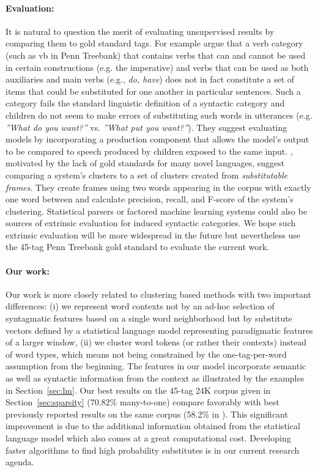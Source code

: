 \documentclass[11pt]{article}
\newcommand{\collapseResult}{70.82}
\begin{document}
\paragraph{Evaluation:}
It is natural to question the merit of evaluating unsupervised results
by comparing them to gold standard tags.  For example
\cite{freudenthal2005resolution} argue that a verb category (such as
{\sc vb} in Penn Treebank) that contains verbs that can and cannot be
used in certain constructions (e.g. the imperative) and verbs that can
be used as both auxiliaries and main verbs (e.g., {\em do, have}) does
not in fact constitute a set of items that could be substituted for
one another in particular sentences.  Such a category fails the
standard linguistic definition of a syntactic category and children do
not seem to make errors of substituting such words in utterances
(e.g. {\em''What do you want?''} vs. {\em *''What put you want?''}).
They suggest evaluating models by incorporating a production component
that allows the model's output to be compared to speech produced by
children exposed to the same input.  \cite{frank2009evaluating},
motivated by the lack of gold standards for many novel languages,
suggest comparing a system's clusters to a set of clusters created
from {\em substitutable frames}.  They create frames using two words
appearing in the corpus with exactly one word between and calculate
precision, recall, and F-score of the system's clustering.
Statistical parsers or factored machine learning systems could also be
sources of extrinsic evaluation for induced syntactic categories.  We
hope such extrinsic evaluation will be more widespread in the future
but nevertheless use the 45-tag Penn Treebank gold standard to
evaluate the current work.

\paragraph{Our work:}
Our work is more closely related to clustering based methods with two
important differences: (i) we represent word contexts not by an ad-hoc
selection of syntagmatic features based on a single word neighborhood
but by substitute vectors defined by a statistical language model
representing paradigmatic features of a larger window, (ii) we cluster
word tokens (or rather their contexts) instead of word types, which
means not being constrained by the one-tag-per-word assumption from
the beginning.  The features in our model incorporate semantic as well
as syntactic information from the context as illustrated by the
examples in Section~\ref{sec:lm}.  Our best results on the 45-tag 24K
corpus given in Section~\ref{sec:sparsity} (\collapseResult\% many-to-one)
compare favorably with best previously reported results on the same
corpus (58.2\% in \cite{Gao:2008:CBE:1613715.1613761}).  This
significant improvement is due to the additional information obtained
from the statistical language model which also comes at a great
computational cost.  Developing faster algorithms to find high
probability substitutes is in our current research agenda.
\end{document}
